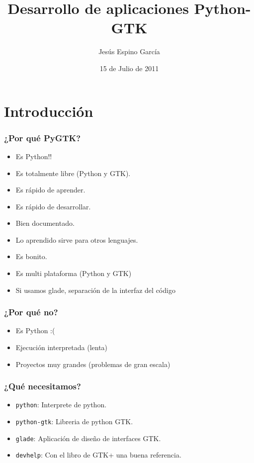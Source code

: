 \documentclass[10pt]{beamer}
\title{Desarrollo de aplicaciones Python-GTK}
\author{Jesús Espino García}
\date{15 de Julio de 2011}
\institute[Python Madrid 2011]{Kaleidos\\Python Madrid 2011}
\begin{document}
  \frame{\maketitle}

  \section{Introducción}
  \begin{frame}[containsverbatim]
    \frametitle{¿Por qué PyGTK?}

    \begin{itemize}
      \item Es Python!!
      \item Es totalmente libre (Python y GTK).
      \item Es rápido de aprender.
      \item Es rápido de desarrollar.
      \item Bien documentado.
      \item Lo aprendido sirve para otros lenguajes.
      \item Es bonito.
      \item Es multi plataforma (Python y GTK)
      \item Si usamos glade, separación de la interfaz del código
    \end{itemize}
  \end{frame}
  
  \begin{frame}
    \frametitle{¿Por qué no?}

    \begin{itemize}
      \item Es Python :(
      \item Ejecución interpretada (lenta)
      \item Proyectos muy grandes (problemas de gran escala)
    \end{itemize}
  \end{frame}
  
  \begin{frame}[containsverbatim]
    \frametitle{¿Qué necesitamos?}
  
    \begin{itemize}
      \item \verb+python+: Interprete de python.
      \item \verb+python-gtk+: Libreria de python GTK.
      \item \verb+glade+: Aplicación de diseño de interfaces GTK.
      \item \verb+devhelp+: Con el libro de GTK+ una buena referencia.
    \end{itemize}
  \end{frame}
\end{document}
